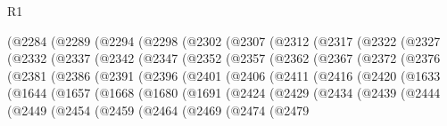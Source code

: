 \begin{lexlean}{R1}
\begin{coremodule}
    (@2284
      (@2289
        (@2294
          (@2298
            (@2302
              (@2307
                (@2312
                  (@2317
                    (@2322
                      (@2327
                        (@2332
                          (@2337
                            (@2342
                              (@2347
                                (@2352
                                  (@2357
                                    (@2362
                                      (@2367
                                        (@2372
                                          (@2376
                                            (@2381
                                              (@2386
                                                (@2391
                                                  (@2396
                                                    (@2401
                                                      (@2406
                                                        (@2411
                                                          (@2416
                                                            (@2420
                                                              (@1633
                                                                (@1644
                                                                  (@1657
                                                                    (@1668
                                                                      (@1680
                                                                        (@1691
                                                                          (@2424
                                                                            (@2429
                                                                              (@2434
                                                                                (@2439
                                                                                  (@2444
                                                                                    (@2449
                                                                                      (@2454
                                                                                        (@2459
                                                                                          (@2464
                                                                                            (@2469
                                                                                              (@2474
                                                                                                (@2479

\end{coremodule}
\end{lexlean}
